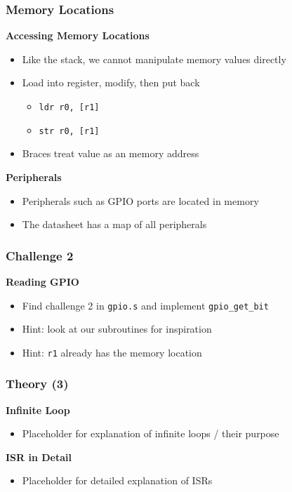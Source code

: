 \documentclass{beamer}
\begin{document}
\begin{frame}
	\frametitle{Memory Locations}
	\textbf{Accessing Memory Locations}
    \begin{itemize}
		\item Like the stack, we cannot manipulate memory values directly
		\item Load into register, modify, then put back
		\begin{itemize}
			\item \texttt{ldr r0, [r1]}
			\item \texttt{str r0, [r1]}
		\end{itemize}
		\item Braces treat value as an memory address
    \end{itemize}
	\textbf{Peripherals}
	\begin{itemize}
		\item Peripherals such as GPIO ports are located in memory
		\item The datasheet has a map of all peripherals
	\end{itemize}
\end{frame}

\begin{frame}
	\frametitle{Challenge 2}
	\textbf{Reading GPIO}
	\begin{itemize}
		\item Find challenge 2 in \texttt{gpio.s} and implement \texttt{gpio\_get\_bit}
		\item Hint: look at our subroutines for inspiration
		\item Hint: \texttt{r1} already has the memory location
	\end{itemize}
\end{frame}

\begin{frame}
    \frametitle{Theory (3)}
    \textbf{Infinite Loop}
    \begin{itemize}
        \item Placeholder for explanation of infinite loops / their purpose
    \end{itemize}
    \textbf{ISR in Detail}
    \begin{itemize}
        \item Placeholder for detailed explanation of ISRs
    \end{itemize}
\end{frame}
\end{document}
